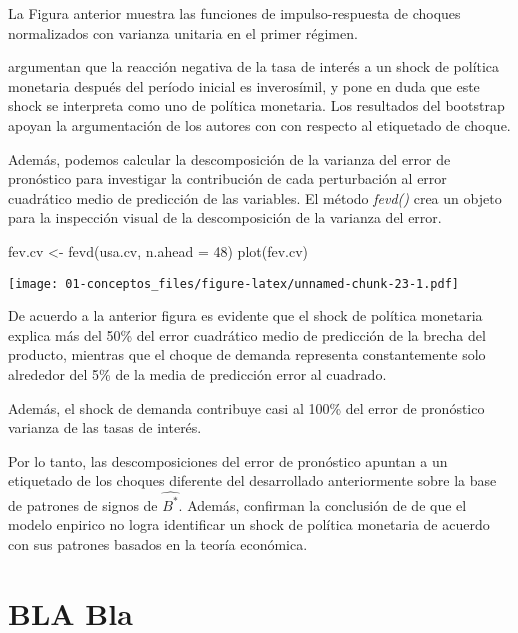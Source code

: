 \documentclass[
]{book}
\newenvironment{Shaded}{\begin{snugshade}}{\end{snugshade}}
\newcommand{\AttributeTok}[1]{\textcolor[rgb]{0.77,0.63,0.00}{#1}}
\newcommand{\DecValTok}[1]{\textcolor[rgb]{0.00,0.00,0.81}{#1}}
\newcommand{\FunctionTok}[1]{\textcolor[rgb]{0.00,0.00,0.00}{#1}}
\newcommand{\NormalTok}[1]{#1}
\newcommand{\OtherTok}[1]{\textcolor[rgb]{0.56,0.35,0.01}{#1}}
\begin{document}
La Figura anterior muestra las funciones de impulso-respuesta de choques normalizados con varianza unitaria en el primer régimen.

\citet{Herwartz2016} argumentan que la reacción negativa de la tasa de interés a un shock de política monetaria después del período inicial es inverosímil, y pone en duda que este shock se interpreta como uno de política monetaria. Los resultados del bootstrap apoyan la argumentación de los autores con
con respecto al etiquetado de choque.

Además, podemos calcular la descomposición de la varianza del error de pronóstico para investigar la contribución de cada perturbación al error cuadrático medio de predicción de las variables. El método \emph{fevd()}
crea un objeto para la inspección visual de la descomposición de la varianza del error.

\begin{Shaded}
\begin{Highlighting}[]
\NormalTok{fev.cv }\OtherTok{\textless{}{-}} \FunctionTok{fevd}\NormalTok{(usa.cv, }\AttributeTok{n.ahead =} \DecValTok{48}\NormalTok{)}
\FunctionTok{plot}\NormalTok{(fev.cv)}
\end{Highlighting}
\end{Shaded}

\texttt{[image: 01-conceptos\_files/figure-latex/unnamed-chunk-23-1.pdf]}

De acuerdo a la anterior figura es evidente que el shock de política monetaria explica más del 50\% del error cuadrático medio de predicción de la brecha del producto, mientras que el choque de demanda representa constantemente solo alrededor del 5\% de la media de predicción
error al cuadrado.

Además, el shock de demanda contribuye casi al 100\% del error de pronóstico
varianza de las tasas de interés.

Por lo tanto, las descomposiciones del error de pronóstico apuntan a un
etiquetado de los choques diferente del desarrollado anteriormente sobre la base de patrones de signos de \(\hat{B^{*}}\). Además, confirman la conclusión de \citet{Herwartz2016} de que el modelo enpirico no logra identificar un shock de política monetaria de acuerdo con sus patrones basados en la teoría económica.

\hypertarget{bla-bla}{%
\section{BLA Bla}\label{bla-bla}}
\end{document}
